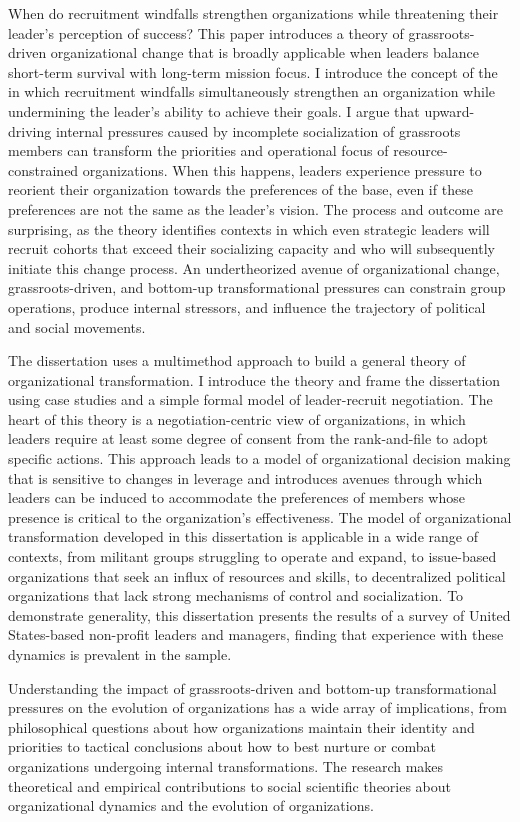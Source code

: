 \abstract
When do recruitment windfalls strengthen organizations while threatening their leader’s perception of success? This paper introduces a theory of grassroots-driven organizational change that is broadly applicable when leaders balance short-term survival with long-term mission focus. 
I introduce the concept of the  in which recruitment windfalls simultaneously strengthen an organization while undermining the leader’s ability to achieve their goals. I argue that upward- driving internal pressures caused by incomplete socialization of grassroots members can transform the priorities and operational focus of resource-constrained organizations. When this happens, leaders experience pressure to reorient their organization towards the preferences of the base, even if these preferences are not the same as the leader’s vision. The process and outcome are surprising, as the theory identifies contexts in which even strategic leaders will recruit cohorts that exceed their socializing capacity and who will subsequently initiate this change process. An undertheorized avenue of organizational change, grassroots-driven, and bottom-up transformational pressures can constrain group operations, produce internal stressors, and influence the trajectory of political and social movements.

The dissertation uses a multimethod approach to build a general theory of organizational transformation. I introduce the theory and frame the dissertation using case studies and a simple formal model of leader-recruit negotiation.  The heart of this theory is a negotiation-centric view of organizations, in which leaders require at least some degree of consent from the rank-and-file to adopt specific actions. This approach leads to a model of organizational decision making that is sensitive to changes in leverage and introduces avenues through which leaders can be induced to accommodate the preferences of members whose presence is critical to the organization’s effectiveness. The model of organizational transformation developed in this dissertation is applicable in a wide range of contexts, from militant groups struggling to operate and expand, to issue-based organizations that seek an influx of resources and skills, to decentralized political organizations that lack strong mechanisms of control and socialization. To demonstrate generality, this dissertation presents the results of a survey of United States-based non-profit leaders and managers, finding that experience with these dynamics is prevalent in the sample.
 
Understanding the impact of grassroots-driven and bottom-up transformational pressures on the evolution of organizations has a wide array of implications, from philosophical questions about how organizations maintain their identity and priorities to tactical conclusions about how to best nurture or combat organizations undergoing internal transformations. The research makes theoretical and empirical contributions to social scientific theories about organizational dynamics and the evolution of organizations.
